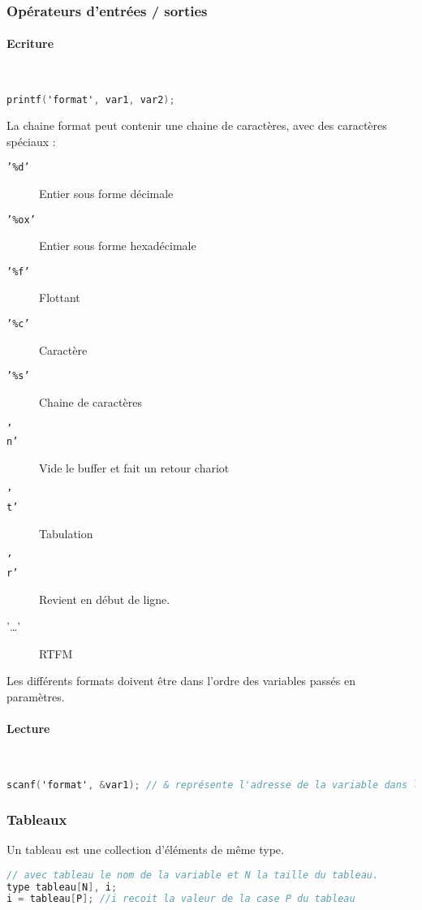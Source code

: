 \documentclass[12pt,a4paper,openany]{article}
\begin{document}
\subsubsection{Opérateurs d'entrées / sorties}
\paragraph{Ecriture}~\\
\begin{lstlisting}[language=C, caption=Syntaxe de l'appel de printf]
printf('format', var1, var2);
\end{lstlisting}
La chaine format peut contenir une chaine de caractères, avec des caractères spéciaux : 
\begin{description}
	\item[\texttt{'\%d'}] Entier sous forme décimale
	\item[\texttt{'\%ox'}] Entier sous forme hexadécimale
	\item[\texttt{'\%f'}] Flottant 
	\item[\texttt{'\%c'}] Caractère 
	\item[\texttt{'\%s'}] Chaine de caractères 
	\item[\texttt{'\\n'}] Vide le buffer et fait un retour chariot 
	\item[\texttt{'\\t'}] Tabulation 
	\item[\texttt{'\\r'}] Revient en début de ligne.
	\item['\ldots'] RTFM	
\end{description}
Les différents formats doivent être dans l'ordre des variables passés en paramètres.
\paragraph{Lecture}~\newline
\begin{lstlisting}[language=C, caption=Syntaxe de l'appel de scanf]
scanf('format', &var1); // & représente l'adresse de la variable dans laquelle écrire.
\end{lstlisting}

\subsubsection{Tableaux}
Un tableau est une collection d'éléments de même type.
\begin{lstlisting}[language=C, caption=Syntaxe de déclaration d'un tableau]
// avec tableau le nom de la variable et N la taille du tableau. 
type tableau[N], i; 
i = tableau[P]; //i recoit la valeur de la case P du tableau
\end{lstlisting}
\end{document}
